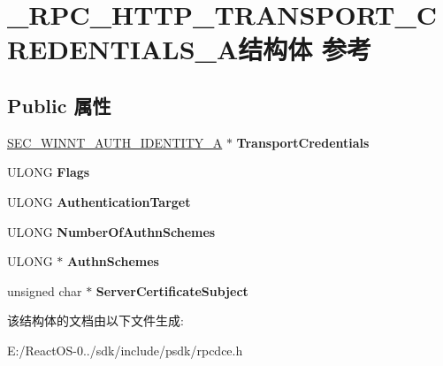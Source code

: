 \hypertarget{struct___r_p_c___h_t_t_p___t_r_a_n_s_p_o_r_t___c_r_e_d_e_n_t_i_a_l_s___a}{}\section{\+\_\+\+R\+P\+C\+\_\+\+H\+T\+T\+P\+\_\+\+T\+R\+A\+N\+S\+P\+O\+R\+T\+\_\+\+C\+R\+E\+D\+E\+N\+T\+I\+A\+L\+S\+\_\+\+A结构体 参考}
\label{struct___r_p_c___h_t_t_p___t_r_a_n_s_p_o_r_t___c_r_e_d_e_n_t_i_a_l_s___a}
\subsection*{Public 属性}
\begin{DoxyCompactItemize}
\item 
\mbox{\label{struct___r_p_c___h_t_t_p___t_r_a_n_s_p_o_r_t___c_r_e_d_e_n_t_i_a_l_s___a_a500b2765c6e057e57acfd2234c57bf09}} 
\hyperlink{struct___s_e_c___w_i_n_n_t___a_u_t_h___i_d_e_n_t_i_t_y___a}{S\+E\+C\+\_\+\+W\+I\+N\+N\+T\+\_\+\+A\+U\+T\+H\+\_\+\+I\+D\+E\+N\+T\+I\+T\+Y\+\_\+A} $\ast$ {\bfseries Transport\+Credentials}
\item 
\mbox{\label{struct___r_p_c___h_t_t_p___t_r_a_n_s_p_o_r_t___c_r_e_d_e_n_t_i_a_l_s___a_ad5d89fbeaf6580a2cbc1c9c912633767}} 
U\+L\+O\+NG {\bfseries Flags}
\item 
\mbox{\label{struct___r_p_c___h_t_t_p___t_r_a_n_s_p_o_r_t___c_r_e_d_e_n_t_i_a_l_s___a_aecc52135adb6f7b422dd99037cecea0e}} 
U\+L\+O\+NG {\bfseries Authentication\+Target}
\item 
\mbox{\label{struct___r_p_c___h_t_t_p___t_r_a_n_s_p_o_r_t___c_r_e_d_e_n_t_i_a_l_s___a_a9beb5aa211d52d5908410bb906dd86a1}} 
U\+L\+O\+NG {\bfseries Number\+Of\+Authn\+Schemes}
\item 
\mbox{\label{struct___r_p_c___h_t_t_p___t_r_a_n_s_p_o_r_t___c_r_e_d_e_n_t_i_a_l_s___a_a735e7fc3aabb05abbbbab6e0487accec}} 
U\+L\+O\+NG $\ast$ {\bfseries Authn\+Schemes}
\item 
\mbox{\label{struct___r_p_c___h_t_t_p___t_r_a_n_s_p_o_r_t___c_r_e_d_e_n_t_i_a_l_s___a_a6e96f18b19b16c5cea2ba0c3ec490010}} 
unsigned char $\ast$ {\bfseries Server\+Certificate\+Subject}
\end{DoxyCompactItemize}


该结构体的文档由以下文件生成\+:\begin{DoxyCompactItemize}
\item 
E\+:/\+React\+O\+S-\/0../sdk/include/psdk/rpcdce.\+h\end{DoxyCompactItemize}
